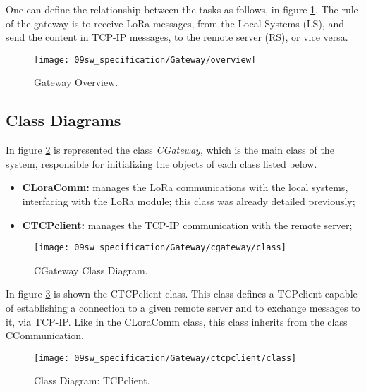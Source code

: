 One can define the relationship between the tasks as follows, in figure \ref{fig:GwOverview}. The rule of the gateway is to receive LoRa messages, from the Local Systems (LS), and send the content in TCP-IP messages, to the remote server (RS), or vice versa.

\begin{figure}[H]
	\centering
	\texttt{[image: 09sw\_specification/Gateway/overview]}
	\caption{Gateway Overview.}
	\label{fig:GwOverview}
\end{figure}

\subsection{Class Diagrams}
In figure \ref{fig:GwclassDiag} is represented the class \textit{CGateway}, which is the main class of the system, responsible for initializing the objects of each class listed below.

\begin{itemize}
	\item \textbf{CLoraComm:} manages the LoRa communications with the local systems, interfacing with the LoRa module; this class was already detailed previously;
	
	\item \textbf{CTCPclient:} manages the TCP-IP communication with the remote server;
\end{itemize}

\begin{figure}[H]
	\centering	\texttt{[image: 09sw\_specification/Gateway/cgateway/class]}
	\caption{CGateway Class Diagram.}
	\label{fig:GwclassDiag}
\end{figure}


In figure \ref{fig:TCPclientClass} is shown the CTCPclient class. This class defines a TCPclient capable of establishing a connection to a given remote server and to exchange messages to it, via TCP-IP. Like in the CLoraComm class, this class inherits from the class CCommunication.

\begin{figure}[H]
	\centering
	\texttt{[image: 09sw\_specification/Gateway/ctcpclient/class]}
	\caption{Class Diagram: TCPclient.}
	\label{fig:TCPclientClass}
\end{figure}

\clearpage
